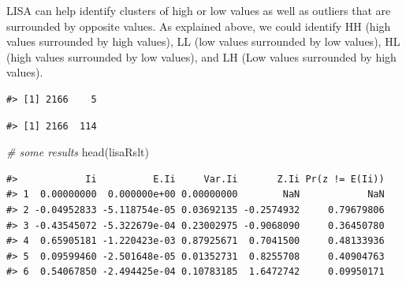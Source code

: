 \documentclass[
  11pt,
]{book}
\newenvironment{Shaded}{\begin{snugshade}}{\end{snugshade}}
\newcommand{\AttributeTok}[1]{\textcolor[rgb]{0.77,0.63,0.00}{#1}}
\newcommand{\CommentTok}[1]{\textcolor[rgb]{0.56,0.35,0.01}{\textit{#1}}}
\newcommand{\ConstantTok}[1]{\textcolor[rgb]{0.00,0.00,0.00}{#1}}
\newcommand{\DocumentationTok}[1]{\textcolor[rgb]{0.56,0.35,0.01}{\textbf{\textit{#1}}}}
\newcommand{\FunctionTok}[1]{\textcolor[rgb]{0.00,0.00,0.00}{#1}}
\newcommand{\NormalTok}[1]{#1}
\newcommand{\OtherTok}[1]{\textcolor[rgb]{0.56,0.35,0.01}{#1}}
\newcommand{\SpecialCharTok}[1]{\textcolor[rgb]{0.00,0.00,0.00}{#1}}
\begin{document}
LISA can help identify clusters of high or low values as well as outliers that are surrounded by opposite values. As explained above, we could identify HH (high values surrounded by high values), LL (low values surrounded by low values), HL (high values surrounded by low values), and LH (Low values surrounded by high values).

\begin{Shaded}
\end{Shaded}

\begin{verbatim}
#> [1] 2166    5
\end{verbatim}

\begin{verbatim}
#> [1] 2166  114
\end{verbatim}

\begin{Shaded}
\begin{Highlighting}[]
\CommentTok{\# some results }
\FunctionTok{head}\NormalTok{(lisaRslt)}
\end{Highlighting}
\end{Shaded}

\begin{verbatim}
#>            Ii          E.Ii     Var.Ii       Z.Ii Pr(z != E(Ii))
#> 1  0.00000000  0.000000e+00 0.00000000        NaN            NaN
#> 2 -0.04952833 -5.118754e-05 0.03692135 -0.2574932     0.79679806
#> 3 -0.43545072 -5.322679e-04 0.23002975 -0.9068090     0.36450780
#> 4  0.65905181 -1.220423e-03 0.87925671  0.7041500     0.48133936
#> 5  0.09599460 -2.501648e-05 0.01352731  0.8255708     0.40904763
#> 6  0.54067850 -2.494425e-04 0.10783185  1.6472742     0.09950171
\end{verbatim}
\end{document}
